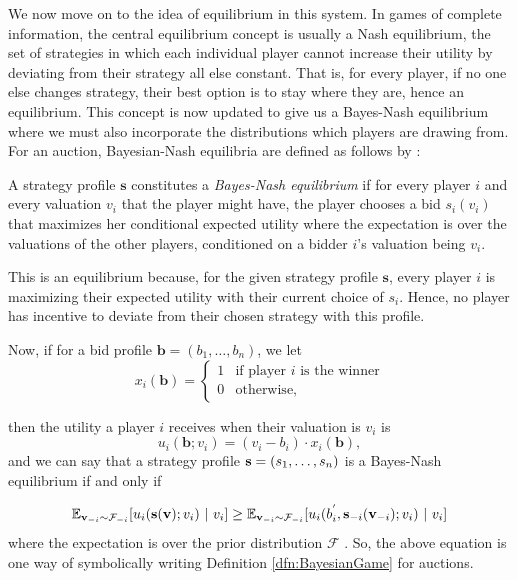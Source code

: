 \documentclass[12pt,twoside]{reedthesis}
\begin{document}
We now move on to the idea of equilibrium in this system. In games of complete information, the central equilibrium concept is usually a Nash equilibrium, the set of strategies in which each individual player cannot increase their utility by deviating from their strategy all else constant. That is, for every player, if no one else changes strategy, their best option is to stay where they are, hence an equilibrium. This concept is now updated to give us a Bayes-Nash equilibrium where we must also incorporate the distributions which players are drawing from. For an auction, Bayesian-Nash equilibria are defined as follows by \cite{Roughgarden2017}:

\begin{dfn}
	A strategy profile $\textbf{s}$ constitutes a {\em Bayes-Nash equilibrium} if for every player $i$ and every valuation $v_i$ that the player might have, the player chooses a bid $s_i(v_i)$ that maximizes her conditional expected utility where the expectation is over the valuations of the other players, conditioned on a bidder $i$'s valuation being $v_i$.
	\label{dfn:BayesNashEQ} 
\end{dfn}
This is an equilibrium because, for the given strategy profile $\textbf{s}$, every player $i$ is maximizing their expected utility with their current choice of $s_i$. Hence, no player has incentive to deviate from their chosen strategy with this profile.
 
 Now, if for a bid profile $\textbf{b} = (b_1, \ldots, b_n)$, we let 
\[
	x_i(\textbf{b}) =
	\begin{cases}
		1 & \text{if player $i$ is the winner} \\
		0 & \text{otherwise},
	\end{cases}
\]

then the utility a player $i$ receives when their valuation is $v_i$ is 
$$u_i(\textbf{b}; v_i) = (v_i - b_i) \cdot x_i(\textbf{b}),$$ and we can say that a strategy profile $\textbf{s} = (s_1, \ldots, s_n)$ is a Bayes-Nash equilibrium if and only if


$$ \mathbb{E}_{\textbf{v}_{-i} \sim \mathcal{F}_{-i}} [u_i(\textbf{s} (\textbf{v}); v_i) \ | \ v_i] \geq \mathbb{E}_{\textbf{v}_{-i} \sim \mathcal{F}_{-i}} [u_i(b^{'}_i, \textbf{s}_{-i}(\textbf{v}_{-i}); v_i) \ | \ v_i] $$ where the expectation is over the prior distribution $\mathcal{F}$ \citep{Roughgarden2017}. So, the above equation is one way of symbolically writing Definition \ref{dfn:BayesianGame} for auctions.
\end{document}
